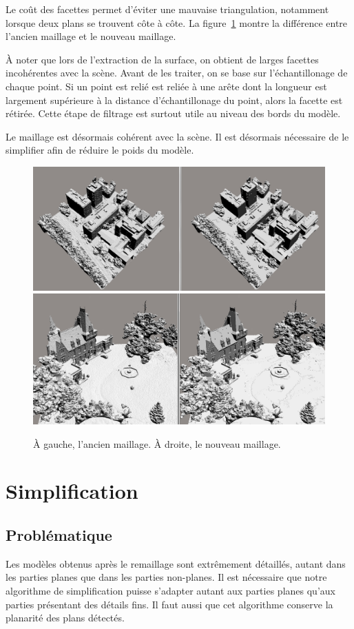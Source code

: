 ﻿\documentclass[12pt, twoside]{article}
\let\oldsection\section
\def\section{\cleardoublepage\oldsection}
\begin{document}
Le coût des facettes permet d'éviter une mauvaise triangulation, notamment lorsque deux plans se trouvent côte à côte. La figure~\ref{fig:avap} montre la différence entre l'ancien maillage et le nouveau maillage.

À noter que lors de l'extraction de la surface, on obtient de larges facettes incohérentes avec la scène. Avant de les traiter, on se base sur l'échantillonage de chaque point. Si un point est relié est reliée à une arête dont la longueur est largement supérieure à la distance d'échantillonage du point, alors la facette est rétirée. Cette étape de filtrage est surtout utile au niveau des bords du modèle.

Le maillage est désormais cohérent avec la scène. Il est désormais nécessaire de le simplifier afin de réduire le poids du modèle.

\begin{figure}[h]
\centering
\includegraphics[scale=0.35]{Comparo4.png} \includegraphics[scale=0.34]{Comparo5.png} 
\caption{\label{fig:avap} À gauche, l'ancien maillage. À droite, le nouveau maillage.}
\end{figure}

\section{Simplification}
\subsection{Problématique}
Les modèles obtenus après le remaillage sont extrêmement détaillés, autant dans les parties planes que dans les parties non-planes. Il est nécessaire que notre algorithme de simplification puisse s'adapter autant aux parties planes qu'aux parties présentant des détails fins. Il faut aussi que cet algorithme conserve la planarité des plans détectés.
\end{document}
